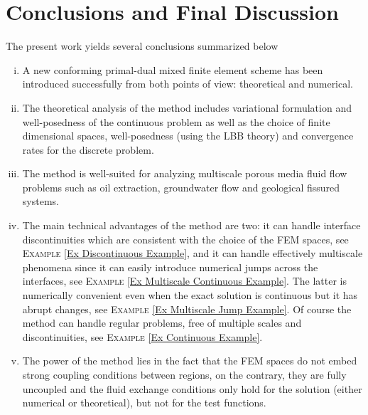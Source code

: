 \documentclass[3p]{elsarticle}
\begin{document}
\section{Conclusions and Final Discussion}\label{Sec Conclusions}
%
%
%
%
The present work yields several conclusions summarized below
%
%
\begin{enumerate}[(i)]
\item A new conforming primal-dual mixed finite element scheme has been introduced successfully from both points of view: theoretical and numerical.

\item The theoretical analysis of the method includes variational formulation and well-posedness of the continuous problem as well as the choice of finite dimensional spaces, well-posedness (using the LBB theory) and convergence rates for the discrete problem.

\item The method is well-suited for analyzing multiscale porous media fluid flow problems such as oil extraction, groundwater flow and geological fissured systems.

\item The main technical advantages of the method are two: it can handle interface discontinuities which are consistent with the choice of the FEM spaces, see \textsc{Example} \ref{Ex Discontinuous Example}, and it can handle effectively multiscale phenomena since it can easily introduce numerical jumps across the interfaces, see \textsc{Example} \ref{Ex Multiscale Continuous Example}. The latter is numerically convenient even when the exact solution is continuous but it has abrupt changes, see \textsc{Example} \ref{Ex Multiscale Jump Example}. Of course the method can handle regular problems, free of multiple scales and discontinuities, see \textsc{Example} \ref{Ex Continuous Example}.

\item The power of the method lies in the fact that the FEM spaces do not embed strong coupling conditions between regions, on the contrary, they are fully uncoupled and the fluid exchange conditions only hold for the solution (either numerical or theoretical), but not for the test functions.


\end{enumerate}
\end{document}
